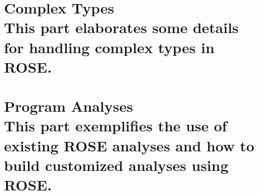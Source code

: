 \documentclass[10pt]{book}
\begin{document}










\part[Complex Types]{ Complex Types \\
\vspace{1.0in}
\normalsize{This part elaborates some details for handling complex types in
ROSE.}
}







\part[Program Analyses]{ Program Analyses \\
\vspace{1.0in}
\normalsize{This part exemplifies the use of existing ROSE analyses and how
to build customized analyses using ROSE.}
}







 
\end{document}
